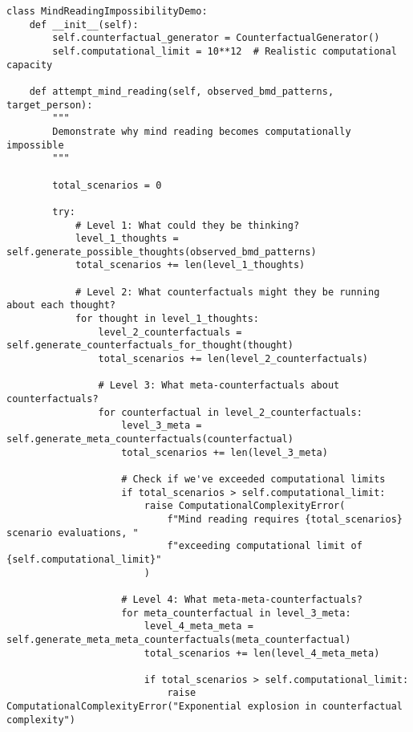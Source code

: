 \documentclass[12pt,a4paper]{article}
\begin{document}
\begin{lstlisting}[style=pythonstyle, caption=Demonstration of Mind Reading Computational Impossibility]
class MindReadingImpossibilityDemo:
    def __init__(self):
        self.counterfactual_generator = CounterfactualGenerator()
        self.computational_limit = 10**12  # Realistic computational capacity
        
    def attempt_mind_reading(self, observed_bmd_patterns, target_person):
        """
        Demonstrate why mind reading becomes computationally impossible
        """
        
        total_scenarios = 0
        
        try:
            # Level 1: What could they be thinking?
            level_1_thoughts = self.generate_possible_thoughts(observed_bmd_patterns)
            total_scenarios += len(level_1_thoughts)
            
            # Level 2: What counterfactuals might they be running about each thought?
            for thought in level_1_thoughts:
                level_2_counterfactuals = self.generate_counterfactuals_for_thought(thought)
                total_scenarios += len(level_2_counterfactuals)
                
                # Level 3: What meta-counterfactuals about counterfactuals?
                for counterfactual in level_2_counterfactuals:
                    level_3_meta = self.generate_meta_counterfactuals(counterfactual)
                    total_scenarios += len(level_3_meta)
                    
                    # Check if we've exceeded computational limits
                    if total_scenarios > self.computational_limit:
                        raise ComputationalComplexityError(
                            f"Mind reading requires {total_scenarios} scenario evaluations, "
                            f"exceeding computational limit of {self.computational_limit}"
                        )
                        
                    # Level 4: What meta-meta-counterfactuals?
                    for meta_counterfactual in level_3_meta:
                        level_4_meta_meta = self.generate_meta_meta_counterfactuals(meta_counterfactual)
                        total_scenarios += len(level_4_meta_meta)
                        
                        if total_scenarios > self.computational_limit:
                            raise ComputationalComplexityError("Exponential explosion in counterfactual complexity")
                            

\end{lstlisting}
\end{document}

